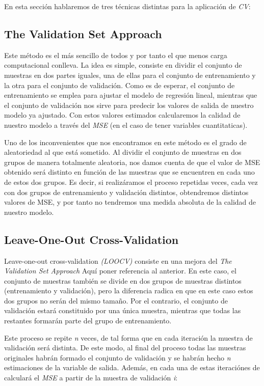 \documentclass[12pt,a4paper,Spanish]{book}
\begin{document}
En esta sección hablaremos de tres técnicas distintas para la aplicación de \textit{CV}:

\subsection{The Validation Set Approach}

Este método es el más sencillo de todos y por tanto el que menos carga computacional conlleva. La idea es simple, consiste en dividir el conjunto de muestras en dos partes iguales, una de ellas para el conjunto de entrenamiento y la otra para el conjunto de validación. Como es de esperar, el conjunto de entrenamiento se emplea para ajustar el modelo de regresión lineal, mientras que el conjunto de validación nos sirve para predecir los valores de salida de nuestro modelo ya ajustado. Con estos valores estimados calcularemos la calidad de nuestro modelo a través del \textit{MSE} (en el caso de tener variables cuantitaticas).

Uno de los inconvenientes que nos encontramos en este método es el grado de aleatoriedad al que está sometido. Al dividir el conjunto de muestras en dos grupos de manera totalmente aleatoria, nos damos cuenta de que el valor de MSE obtenido será distinto en función de las muestras que se encuentren en cada uno de estos dos grupos. Es decir, si realizáramos el proceso repetidas veces, cada vez con dos grupos de entrenamiento y validación distintos, obtendremos distintos valores de MSE, y por tanto no tendremos una medida absoluta de la calidad de nuestro modelo.


\subsection{Leave-One-Out Cross-Validation}

Leave-one-out cross-validation \textit{(LOOCV)} consiste en una mejora del \textit{The Validation Set Approach} Aquí poner referencia al anterior. En este caso, el conjunto de muestras también se divide en dos grupos de muestras distintos (entrenamiento y validación), pero la diferencia radica en que en este caso estos dos grupos no serán del mismo tamaño. Por el contrario, el conjunto de validación estará constituido por una única muestra, mientras que todas las restantes formarán parte del grupo de entrenamiento.

Este proceso se repite \textit{n} veces, de tal forma que en cada iteración la muestra de validación será distinta. De este modo, al final del proceso todas las muestras originales habrán formado el conjunto de validación y se habrán hecho \textit{n} estimaciones de la variable de salida. Además, en cada una de estas iteraciónes de calculará el \textit{MSE} a partir de la muestra de validación \textit{i}:
\end{document}
